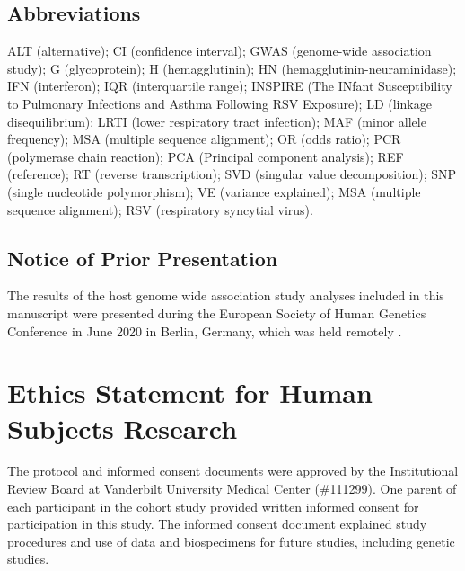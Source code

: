 \documentclass[9pt,lineno]{elife}  %
\makeatletter
\renewcommand{\maketitle}{\bgroup\setlength{\parindent}{0pt}
\begin{flushleft}
  \textbf{\@title}

  \@author
\end{flushleft}\egroup
}
\makeatother
\begin{document}
\maketitle


\subsection*{Abbreviations}
ALT (alternative); CI (confidence interval); GWAS (genome-wide association study); G (glycoprotein); H (hemagglutinin); HN (hemagglutinin-neuraminidase); IFN (interferon); IQR (interquartile range); INSPIRE (The INfant Susceptibility to Pulmonary Infections and Asthma Following RSV Exposure); LD (linkage disequilibrium); LRTI (lower respiratory tract infection); MAF (minor allele frequency); MSA (multiple sequence alignment); OR (odds ratio); PCR (polymerase chain reaction); PCA (Principal component analysis); REF (reference); RT (reverse transcription); SVD (singular value decomposition); SNP (single nucleotide polymorphism); VE (variance explained); MSA (multiple sequence alignment); RSV (respiratory syncytial virus).

\subsection*{Notice of Prior Presentation}
The results of the host genome wide association study analyses included in this manuscript were presented during the European Society of Human Genetics Conference in June 2020 in Berlin, Germany, which was held remotely 
\citep{lawless2020genome}.

\section*{Ethics Statement for Human Subjects Research}
The protocol and informed consent documents were approved by the Institutional Review Board at Vanderbilt University Medical Center (\#111299). 
One parent of each participant in the cohort study provided written informed consent for participation in this study. 
The informed consent document explained study procedures and use of data and biospecimens for future studies, including genetic studies.

\end{document}
